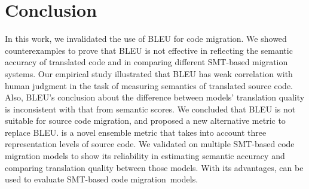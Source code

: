 \section{Conclusion}
In this work, we invalidated the use of BLEU for code
migration. We showed counterexamples to prove that BLEU is not
effective in reflecting the semantic accuracy of translated code and
in comparing different SMT-based migration systems. Our empirical
study illustrated that BLEU has weak correlation with human judgment
in the task of measuring semantics of translated source code. Also,
BLEU's conclusion about the difference between models' translation
quality is inconsistent with that from semantic scores. We concluded
that BLEU is not suitable for source code migration, and proposed a
new alternative metric {\model} to replace BLEU. {\model} is a novel
ensemble metric that takes into account three representation levels of
source code. We validated {\model} on multiple SMT-based code
migration models to show its reliability in estimating semantic
accuracy and comparing translation quality between those models.  With
its advantages, {\model} can be used to evaluate SMT-based code
migration~models.
